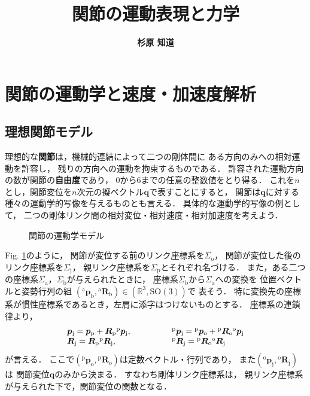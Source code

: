 ﻿\documentclass[a4paper]{jsarticle}
\title{\bf 関節の運動表現と力学}
\author{\Large{\bf 杉原 知道}}
\date{}
\begin{document}
\maketitle

\section{関節の運動学と速度・加速度解析}

\subsection{理想関節モデル}

理想的な{\bf 関節}は，機械的連結によって二つの剛体間に
ある方向のみへの相対運動を許容し，
残りの方向への運動を拘束するものである．
許容された運動方向の数が関節の{\bf 自由度}であり，
0から6までの任意の整数値をとり得る．
これを$n$とし，関節変位を$n$次元の擬ベクトル$\bm{q}$で表すことにすると，
関節は$\bm{q}$に対する種々の運動学的写像を与えるものとも言える．
具体的な運動学的写像の例として，
二つの剛体リンク間の相対変位・相対速度・相対加速度を考えよう．

\begin{figure}[htb]
\begin{center}

\caption{関節の運動学モデル}
\label{fig:joint}
\end{center}
\end{figure}

Fig. \ref{fig:joint}のように，
関節が変位する前のリンク座標系を$\Sigma_{\mathrm{o}}$，
関節が変位した後のリンク座標系を$\Sigma_{\mathrm{j}}$，
親リンク座標系を$\Sigma_{\mathrm{p}}$とそれぞれ名づける．
また，ある二つの座標系$\Sigma_{\mathrm{a}}$，$\Sigma_{\mathrm{b}}$が与えられたときに，
座標系$\Sigma_{\mathrm{b}}$から$\Sigma_{\mathrm{a}}$への変換を
位置ベクトルと姿勢行列の組
$({}^{\mathrm{a}}\bm{p}_{\mathrm{b}}, {}^{\mathrm{a}}\bm{R}_{\mathrm{b}})\in(\mathbb{R}^{3},\mathrm{SO}(3))$で
表そう．
特に変換先の座標系が慣性座標系であるとき，左肩に添字はつけないものとする．
座標系の連鎖律より，
\begin{align*}
\begin{array}{l@{\hskip5em}l}
\bm{p}_{\mathrm{j}}=\bm{p}_{\mathrm{p}}+\bm{R}_{\mathrm{p}}{}^{\mathrm{p}}\bm{p}_{\mathrm{j}}, &
{}^{\mathrm{p}}\bm{p}_{\mathrm{j}}={}^{\mathrm{p}}\bm{p}_{\mathrm{o}}+{}^{\mathrm{p}}\bm{R}_{\mathrm{o}}{}^{\mathrm{o}}\bm{p}_{\mathrm{j}} \\
\bm{R}_{\mathrm{j}}=\bm{R}_{\mathrm{p}}{}^{\mathrm{p}}\bm{R}_{\mathrm{j}}, &
{}^{\mathrm{p}}\bm{R}_{\mathrm{j}}={}^{\mathrm{p}}\bm{R}_{\mathrm{o}}{}^{\mathrm{o}}\bm{R}_{\mathrm{j}} \\
\end{array}
\end{align*}
が言える．
ここで$({}^{\mathrm{p}}\bm{p}_{\mathrm{o}}, {}^{\mathrm{p}}\bm{R}_{\mathrm{o}})$は定数ベクトル・行列であり，
また$({}^{\mathrm{o}}\bm{p}_{\mathrm{j}}, {}^{\mathrm{o}}\bm{R}_{\mathrm{j}})$は
関節変位$\bm{q}$のみから決まる．
すなわち剛体リンク座標系は，
親リンク座標系が与えられた下で，関節変位の関数となる．
\end{document}
